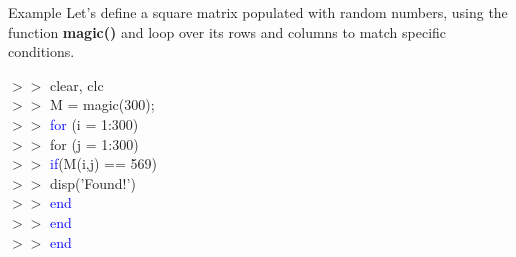 \documentclass[xcolor={dvipsnames,rgb}, aspectratio=169]{beamer}
\begin{document}
\begin{frame}{Example}
Let's define a square matrix populated with random numbers, using the function
\textbf{magic()} and loop over its rows and columns to match specific conditions.

\begin{tcolorbox}[colback=white,colframe=bluepoli]
   $>>$ clear, clc \\
   $>>$ M = magic(300);\\
   $>>$ \textcolor{blue}{for} (i = 1:300)\\
   $>>$ \hspace{1em}\color{blue} for \color{black} (j = 1:300)\\
   $>>$ \hspace{1em}\hspace{1em}\textcolor{blue}{if}(M(i,j) == 569)\\
   $>>$ \hspace{1em}\hspace{1em}\hspace{1em}disp('Found!')\\
   $>>$ \hspace{1em}\hspace{1em}\textcolor{blue}{end}\\
   $>>$ \hspace{1em}\textcolor{blue}{end}\\
   $>>$ \textcolor{blue}{end}
\end{tcolorbox}
\end{frame}

\end{document}
